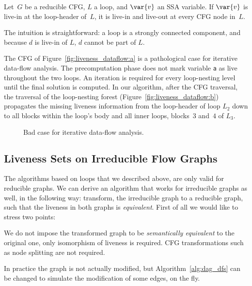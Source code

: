 \begin{lemma}
	\label{lemma:secondpass}
	Let~$G$ be a reducible CFG, $L$ a loop, and $\var{v}$ an SSA variable.
	If $\var{v}$ is live-in at the loop-header of~$L$, it is live-in and live-out at every CFG node in~$L$.
\end{lemma}

The intuition is straightforward: a loop is a strongly connected component, and because $d$ is live-in of $L$, $d$ cannot be part of $L$. 

\begin{example}
	The CFG of Figure~\ref{fig:liveness_dataflow:a} is a pathological case for iterative data-flow analysis.
	The precomputation phase does not mark variable \texttt{a} as live throughout the two loops.
	An iteration is required for every loop-nesting level until the final solution is computed.
	In our algorithm, after the CFG traversal, the traversal of the loop-nesting forest (Figure~\ref{fig:liveness_dataflow:b}) propagates the missing liveness information from the loop-header of loop $L_2$ down to all blocks within the loop's body and all inner loops, \ie blocks~$3$ and~$4$ of $L_3$.
\end{example}

\begin{figure}[t]
   \begin{center}
   \end{center}
   \caption{Bad case for iterative data-flow analysis.}
   \label{fig:liveness_dataflow}
\end{figure}


 \subsection{Liveness Sets on Irreducible Flow Graphs}
\label{sec:irreducible}

The algorithms based on loops that we described above, are only valid for reducible graphs.
We can derive an algorithm that works for irreducible graphs as well, in the following way:
transform, the irreducible graph to a reducible graph, such that the liveness in both graphs is \emph{equivalent}.
First of all we would like to stress two points:
\begin{asparaenum}[(1)]
\item We do not impose the transformed graph to be \emph{semantically equivalent} to the original one, only isomorphism of liveness is required. CFG transformations such as node splitting are not required.
\item In practice the graph is not actually modified, but Algorithm~\ref{alg:dag_dfs} can be changed to simulate the modification of some edges, on the fly.
\end{asparaenum}

